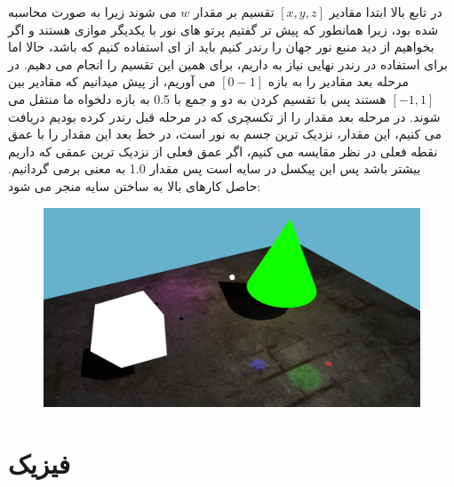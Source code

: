\documentclass[a4paper, 12pt]{book}
\begin{document}
     در تابع بالا ابتدا مقادیر
     $[x, y, z]$
     تقسیم بر مقدار
     $w$
     می شوند زیرا  به صورت  محاسبه شده بود، زیرا همانطور که پیش تر گفتیم پرتو های نور با یکدیگر موازی هستند و اگر بخواهیم از دید منبع نور جهان را رندر کنیم باید از  ای استفاده کنیم که  باشد، حالا اما برای استفاده در رندر نهایی نیاز به  داریم، برای همین این تقسیم را انجام می دهیم. در مرحله بعد مقادیر را به بازه
     $[0-1]$
     می آوریم، از پیش میدانیم که مقادیر بین
     $[-1, 1]$
     هستند پس با تقسیم کردن به دو و جمع با 0.5 به بازه دلخواه ما منتقل می شوند. در مرحله بعد مقدار  را از تکسچری که در مرحله قبل رندر کرده بودیم دریافت می کنیم، این مقدار، نزدیک ترین جسم به نور است، در خط بعد این مقدار را با عمق نقطه فعلی در نظر مقایسه می کنیم، اگر عمق فعلی از نزدیک ترین عمقی که داریم بیشتر باشد پس این پیکسل در سایه است پس مقدار 1.0 به معنی  برمی گردانیم. حاصل کارهای بالا به ساختن سایه منجر می شود:

\begin{figure}[H]
    \centering
    \href{https://github.com/devprofile98/shm}{
        \includegraphics[width=13cm]{images/sceme-shadow.png}
    }
    \caption{}
    \label{fig:my_label}
\end{figure}

\part{فیزیک}
\begin{center}
    \chapter{}
\end{center}
\section{}
\section{}
\end{document}
